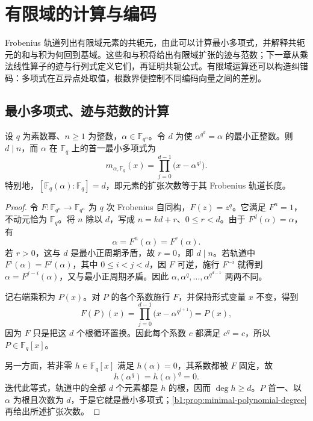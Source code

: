 
\section{有限域的计算与编码}
\label{b1:sec:1704}

%
%
%

Frobenius 轨道列出有限域元素的共轭元，由此可以计算最小多项式，并解释共轭元的和与积为何回到基域。这些和与积将给出有限域扩张的迹与范数；下一章从乘法线性算子的迹与行列式定义它们，再证明共轭公式。有限域运算还可以构造纠错码：多项式在互异点处取值，根数界便控制不同编码向量之间的差别。

\subsection{最小多项式、迹与范数的计算}
\label{b1:subsec:1704:01}

\begin{proposition}\label{b1:prop:frobenius-orbit-minimal}
	设 \(q\) 为素数幂、\(n\geq1\) 为整数，\(\alpha\in\mathbb F_{q^n}\)。令 \(d\) 为使 \(\alpha^{q^d}=\alpha\) 的最小正整数。则 \(d\mid n\)，而 \(\alpha\) 在 \(\mathbb F_q\) 上的首一最小多项式为
	\begin{equation}\label{b1:eq:frobenius-minimal-polynomial}
		m_{\alpha,\mathbb F_q}(x)=\prod_{j=0}^{d-1}\bigl(x-\alpha^{q^j}\bigr).
	\end{equation}
	特别地，\([\mathbb F_q(\alpha):\mathbb F_q]=d\)，即元素的扩张次数等于其 Frobenius 轨道长度。
\end{proposition}
\begin{proof}
	令 \(F:\mathbb F_{q^n}\rightarrow\mathbb F_{q^n}\) 为 \(q\) 次 Frobenius 自同构，\(F(z)=z^q\)。它满足 \(F^n=1\)，不动元恰为 \(\mathbb F_q\)。将 \(n\) 除以 \(d\)，写成 \(n=kd+r\)、\(0\leq r<d\)。由于 \(F^d(\alpha)=\alpha\)，有
	\[
		\alpha=F^n(\alpha)=F^r(\alpha).
	\]
	若 \(r>0\)，这与 \(d\) 是最小正周期矛盾，故 \(r=0\)，即 \(d\mid n\)。若轨道中 \(F^i(\alpha)=F^j(\alpha)\)，其中 \(0\leq i<j<d\)，因 \(F\) 可逆，施行 \(F^{-i}\) 就得到 \(\alpha=F^{j-i}(\alpha)\)，又与最小正周期矛盾。因此 \(\alpha,\alpha^q,\ldots,\alpha^{q^{d-1}}\) 两两不同。

	记右端乘积为 \(P(x)\)。对 \(P\) 的各个系数施行 \(F\)，并保持形式变量 \(x\) 不变，得到
	\[
		F(P)(x)=\prod_{j=0}^{d-1}\bigl(x-\alpha^{q^{j+1}}\bigr)=P(x),
	\]
	因为 \(F\) 只是把这 \(d\) 个根循环置换。因此每个系数 \(c\) 都满足 \(c^q=c\)，所以 \(P\in\mathbb F_q[x]\)。

	另一方面，若非零 \(h\in\mathbb F_q[x]\) 满足 \(h(\alpha)=0\)，其系数都被 \(F\) 固定，故
	\[
		h(\alpha^q)=h(\alpha)^q=0.
	\]
	迭代此等式，轨道中的全部 \(d\) 个元素都是 \(h\) 的根，因而 \(\deg h\geq d\)。\(P\) 首一、以 \(\alpha\) 为根且次数为 \(d\)，于是它就是最小多项式；\cref{b1:prop:minimal-polynomial-degree}再给出所述扩张次数。
\end{proof}

